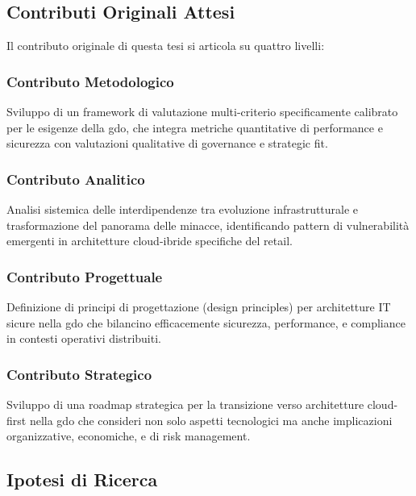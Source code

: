 \subsection{Contributi Originali Attesi}
\label{subsec:contributi-originali}

Il contributo originale di questa tesi si articola su quattro livelli:

\subsubsection{Contributo Metodologico}

Sviluppo di un framework di valutazione multi-criterio specificamente calibrato per le esigenze della \gls{gdo}, che integra metriche quantitative di performance e sicurezza con valutazioni qualitative di governance e strategic fit.

\subsubsection{Contributo Analitico}

Analisi sistemica delle interdipendenze tra evoluzione infrastrutturale e trasformazione del panorama delle minacce, identificando pattern di vulnerabilità emergenti in architetture cloud-ibride specifiche del retail.

\subsubsection{Contributo Progettuale}

Definizione di principi di progettazione (design principles) per architetture IT sicure nella \gls{gdo} che bilancino efficacemente sicurezza, performance, e compliance in contesti operativi distribuiti.

\subsubsection{Contributo Strategico}

Sviluppo di una roadmap strategica per la transizione verso architetture cloud-first nella \gls{gdo} che consideri non solo aspetti tecnologici ma anche implicazioni organizzative, economiche, e di risk management.

\subsection{Ipotesi di Ricerca}
\label{subsec:ipotesi-ricerca}

